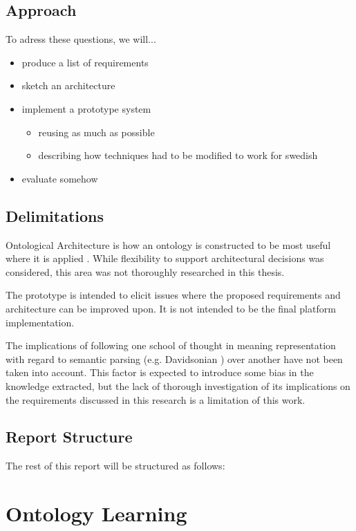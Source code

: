 \documentclass[a4paper]{report}
\begin{document}
\section{Approach}

To adress these questions, we will...

\begin{itemize}
  \item produce a list of requirements
  \item sketch an architecture
  \item implement a prototype system
    \begin{itemize}
      \item reusing as much as possible
      \item describing how techniques had to be modified to work for swedish
    \end{itemize}
  \item evaluate somehow
\end{itemize}

\section{Delimitations}

Ontological Architecture is how an ontology is constructed to be most useful where it is applied \cite{OntArchChapter}. While flexibility to support architectural decisions was considered, this area was not thoroughly researched in this thesis.

The prototype is intended to elicit issues where the proposed requirements and architecture can be improved upon.
It is not intended to be the final platform implementation.

The implications of following one school of thought in meaning representation with regard to semantic parsing (e.g. Davidsonian \cite{DavidsonianSemantics}) over another have not been taken into account.
This factor is expected to introduce some bias in the knowledge extracted, but the lack of thorough investigation of its implications on the requirements discussed in this research is a limitation of this work.

\section{Report Structure}

The rest of this report will be structured as follows:

\chapter{Ontology Learning}
\end{document}
